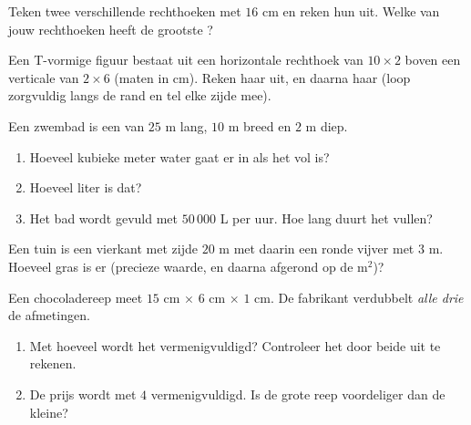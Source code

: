 \begin{exercise}[$\star$]\label{exo:g6:measure:8}
Teken twee verschillende rechthoeken met  $16$ cm en reken hun
 uit. Welke van jouw rechthoeken heeft de grootste ?
\end{exercise}

\begin{exercise}[$\star\star$]\label{exo:g6:measure:9}
Een T-vormige figuur bestaat uit een horizontale rechthoek van $10 \times 2$
boven een verticale van $2 \times 6$ (maten in cm). Reken haar  uit,
en daarna haar  (loop zorgvuldig langs de rand en tel elke zijde mee).
\end{exercise}

\begin{exercise}[$\star\star$]\label{exo:g6:measure:10}
Een zwembad is een  van $25$ m lang, $10$ m breed en $2$ m diep.
\begin{enumerate}
  \item Hoeveel kubieke meter water gaat er in als het vol is?
  \item Hoeveel liter is dat?
  \item Het bad wordt gevuld met $50\,000$ L per uur. Hoe lang duurt het vullen?
\end{enumerate}
\end{exercise}

\begin{exercise}[$\star\star$]\label{exo:g6:measure:11}
Een tuin is een vierkant met zijde $20$ m met daarin een ronde vijver met 
$3$ m. Hoeveel  gras is er (precieze waarde, en daarna afgerond op de
m$^2$)?
\end{exercise}

\begin{exercise}[$\star\star\star$]\label{exo:g6:measure:12}
Een chocoladereep meet $15$ cm $\times$ $6$ cm $\times$ $1$ cm. De fabrikant
verdubbelt \emph{alle drie} de afmetingen.
\begin{enumerate}
  \item Met hoeveel wordt het  vermenigvuldigd? Controleer het door beide
         uit te rekenen.
  \item De prijs wordt met $4$ vermenigvuldigd. Is de grote reep voordeliger dan
        de kleine?
\end{enumerate}
\end{exercise}

